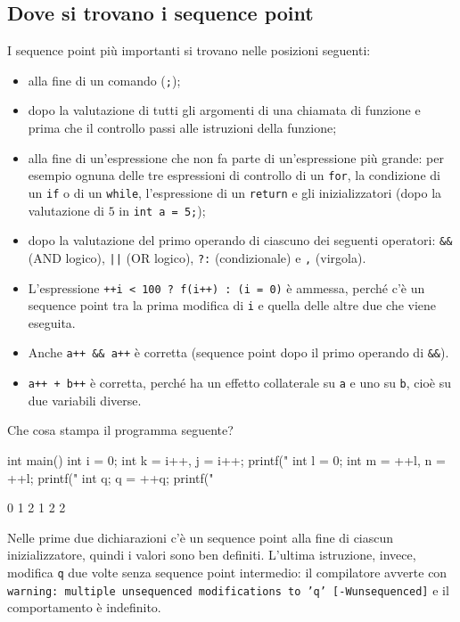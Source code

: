 \documentclass[11pt,a4paper]{article}
\begin{document}
\subsection{Dove si trovano i sequence point}

I sequence point più importanti si trovano nelle posizioni seguenti:
\begin{itemize}
    \item alla fine di un comando (\lstinline|;|);
    \item dopo la valutazione di tutti gli argomenti di una chiamata di funzione e prima che il controllo passi alle istruzioni della funzione;
    \item alla fine di un'espressione che non fa parte di un'espressione più grande: per esempio ognuna delle tre espressioni di controllo di un \lstinline|for|, la condizione di un \lstinline|if| o di un \lstinline|while|, l'espressione di un \lstinline|return| e gli inizializzatori (dopo la valutazione di $5$ in \lstinline|int a = 5;|);
    \item dopo la valutazione del primo operando di ciascuno dei seguenti operatori: \lstinline|&&| (AND logico), \lstinline/||/ (OR logico), \lstinline|?:| (condizionale) e \lstinline|,| (virgola).
\end{itemize}

\begin{esempio}
\begin{itemize}
    \item L'espressione \lstinline|++i < 100 ? f(i++) : (i = 0)| è ammessa, perché c'è un sequence point tra la prima modifica di \lstinline|i| e quella delle altre due che viene eseguita.
    \item Anche \lstinline|a++ && a++| è corretta (sequence point dopo il primo operando di \lstinline|&&|).
    \item \lstinline|a++ + b++| è corretta, perché ha un effetto collaterale su \lstinline|a| e uno su \lstinline|b|, cioè su due variabili diverse.
\end{itemize}
\end{esempio}

\begin{esercizio}
Che cosa stampa il programma seguente?
\begin{codice}
int main()
{
    int i = 0;
    int k = i++, j = i++;
    printf("%
    int l = 0;
    int m = ++l, n = ++l;
    printf("%
    int q;
    q = ++q;
    printf("%
}
\end{codice}
\begin{risultato}
0 1 2
1 2 2
\end{risultato}
Nelle prime due dichiarazioni c'è un sequence point alla fine di ciascun inizializzatore, quindi i valori sono ben definiti. L'ultima istruzione, invece, modifica \lstinline|q| due volte senza sequence point intermedio: il compilatore avverte con
\texttt{warning: multiple unsequenced modifications to 'q' [-Wunsequenced]} e il comportamento è indefinito.
\end{esercizio}
\end{document}
